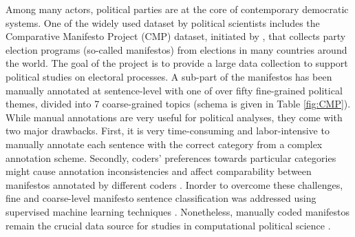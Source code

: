 \documentclass[11pt,a4paper]{article}
\begin{document}


Among many actors, political parties are at the core of contemporary democratic systems. One of the widely used dataset by political scientists includes the Comparative
Manifesto Project (CMP) dataset, initiated by \cite{CMP}, that collects party election programs (so-called manifestos) from elections in many countries around the world. The goal of the project is to provide a large data collection to support political studies on electoral processes. A sub-part of the manifestos has been manually annotated at sentence-level with one of over fifty fine-grained political themes, divided into 7 coarse-grained topics (schema is given in Table \ref{fig:CMP}).  While manual annotations are very useful for political analyses, they come with two major drawbacks. First, it is very time-consuming and labor-intensive to manually annotate each sentence with the correct category from a complex annotation scheme. Secondly, coders' preferences towards particular categories might cause annotation inconsistencies and affect comparability between manifestos annotated by different coders \cite{coder}. Inorder to overcome these challenges, fine and coarse-level manifesto sentence classification was addressed using supervised machine learning techniques \cite{verberne2014automatic, zirn2016classifying}. Nonetheless, manually coded manifestos remain the crucial data source for studies in computational political science \cite{lowe2011scaling, nanni}. 
\end{document}
